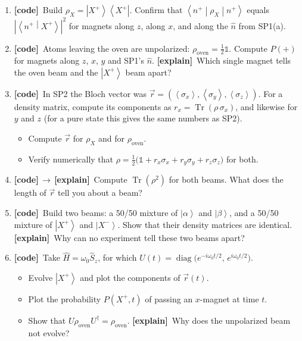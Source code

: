 \documentclass[11pt]{article}
\newif\ifsolutions
\newcommand{\tagbox}[2]{\textcolor{#1}{\textsf{\textbf{[#2]}}}}
\newcommand{\code}{\tagbox{codec}{code}}
\newcommand{\expl}{\tagbox{explc}{explain}}
\newcommand{\codeexpl}{\tagbox{codec}{code}\,$\to$\,\tagbox{explc}{explain}}
\newcommand{\ans}[1]{\ifsolutions\par\noindent\hspace*{1.5em}\textcolor{ansc}{\small\textit{Answer:} #1}\fi}
\newcommand{\ket}[1]{\left|#1\right\rangle}
\newcommand{\bra}[1]{\left\langle#1\right|}
\newcommand{\braket}[2]{\left\langle#1\middle|#2\right\rangle}
\newcommand{\mel}[3]{\left\langle#1\middle|#2\middle|#3\right\rangle}
\newcommand{\expval}[1]{\left\langle#1\right\rangle}
\newcommand{\Sop}{\hat{S}}
\newcommand{\Hop}{\hat{H}}
\newcommand{\one}{\mathbb{1}}
\newcommand{\Tr}{\operatorname{Tr}}
\begin{document}
\begin{enumerate}
\item \code\ Build $\rho_X = \ket{X^+}\bra{X^+}$.
Confirm that $\mel{n^+}{\rho_X}{n^+}$ equals $|\braket{n^+}{X^+}|^2$ for magnets along $z$, along $x$, and along the $\hat n$ from SP1(a).

\item \code\ Atoms leaving the oven are unpolarized: $\rho_{\text{oven}} = \tfrac12\one$.
Compute $P(+)$ for magnets along $z$, $x$, $y$ and SP1's $\hat n$.
\expl\ Which single magnet tells the oven beam and the $\ket{X^+}$ beam apart?
\ans{$P(+) = \tfrac12$ for every axis. An $x$-magnet: $\rho_X$ gives $P(+)=1$, the oven beam gives $\tfrac12$.}

\item \code\ In SP2 the Bloch vector was $\vec r = (\expval{\sigma_x}, \expval{\sigma_y}, \expval{\sigma_z})$.
For a density matrix, compute its components as $r_x = \Tr(\rho\,\sigma_x)$, and likewise for $y$ and $z$
(for a pure state this gives the same numbers as SP2).
\begin{itemize}
\item Compute $\vec r$ for $\rho_X$ and for $\rho_{\text{oven}}$.
\item Verify numerically that $\rho = \tfrac12\big(\one + r_x\sigma_x + r_y\sigma_y + r_z\sigma_z\big)$ for both.
\end{itemize}
\ans{$\vec r_X = (1,0,0)$; $\ \vec r_{\text{oven}} = (0,0,0)$.}

\item \codeexpl\ Compute $\Tr(\rho^2)$ for both beams. What does the length of $\vec r$ tell you about a beam?
\ans{$1$ and $\tfrac12$. $|\vec r| = 1$ means a pure state; $|\vec r| = 0$ means completely unpolarized; in general $\Tr\rho^2 = \tfrac12(1 + |\vec r|^2)$.}

\item \code\ Build two beams: a 50/50 mixture of $\ket\alpha$ and $\ket\beta$, and a 50/50 mixture of $\ket{X^+}$ and $\ket{X^-}$.
Show that their density matrices are identical.
\expl\ Why can no experiment tell these two beams apart?
\ans{Both equal $\tfrac12\one$. Every measurement probability is computed from $\rho$ alone, so identical $\rho$ means identical statistics for every experiment.}

\item \code\ Take $\Hop = \omega_0\Sop_z$, for which $U(t) = \operatorname{diag}\!\big(e^{-i\omega_0 t/2},\, e^{i\omega_0 t/2}\big)$.
\begin{itemize}
\item Evolve $\ket{X^+}$ and plot the components of $\vec r(t)$.
\item Plot the probability $P(X^+, t)$ of passing an $x$-magnet at time $t$.
\item Show that $U\rho_{\text{oven}}U^\dagger = \rho_{\text{oven}}$. \expl\ Why does the unpolarized beam not evolve?
\end{itemize}
\ans{$r_x = \cos\omega_0 t$, $r_y = \sin\omega_0 t$, $r_z = 0$: the Bloch vector precesses about $z$. $P(X^+,t) = \cos^2(\omega_0 t/2)$. $\tfrac12\one$ commutes with every $U$, so it has no direction to precess.}
\end{enumerate}
\end{document}
